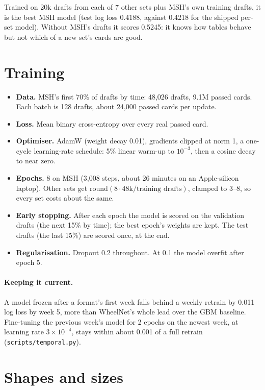\documentclass[11pt,letterpaper]{article}
\newcommand{\code}[1]{\texttt{\small #1}}
\begin{document}
Trained on 20k drafts from each of 7 other sets plus MSH's own training drafts, it is the best MSH model
(test log loss 0.4188, against 0.4218 for the shipped per-set model). Without MSH's drafts it scores 0.5245:
it knows how tables behave but not which of a new set's cards are good.

\section{Training}

\begin{itemize}
\item \textbf{Data.} MSH's first 70\% of drafts by time: 48,026 drafts, 9.1M passed cards. Each batch is 128
drafts, about 24,000 passed cards per update.
\item \textbf{Loss.} Mean binary cross-entropy over every real passed card.
\item \textbf{Optimiser.} AdamW (weight decay 0.01), gradients clipped at norm 1, a one-cycle learning-rate
schedule: 5\% linear warm-up to $10^{-3}$, then a cosine decay to near zero.
\item \textbf{Epochs.} 8 on MSH (3,008 steps, about 26 minutes on an Apple-silicon laptop). Other sets get
$\mathrm{round}(8 \cdot 48\text{k} / \text{training drafts})$, clamped to 3--8, so every set costs about the
same.
\item \textbf{Early stopping.} After each epoch the model is scored on the validation drafts (the next 15\% by
time); the best epoch's weights are kept. The test drafts (the last 15\%) are scored once, at the end.
\item \textbf{Regularisation.} Dropout 0.2 throughout. At 0.1 the model overfit after epoch 5.
\end{itemize}

\paragraph{Keeping it current.} A model frozen after a format's first week falls behind a weekly retrain by
0.011 log loss by week 5, more than WheelNet's whole lead over the GBM baseline. Fine-tuning the previous
week's model for 2 epochs on the newest week, at learning rate $3\times10^{-4}$, stays within about 0.001 of a
full retrain (\code{scripts/temporal.py}).

\section{Shapes and sizes}
\end{document}

